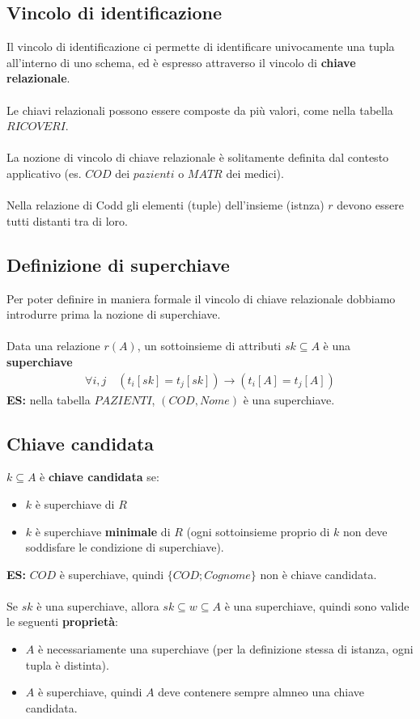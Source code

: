 \subsection{Vincolo di identificazione}
Il vincolo di identificazione ci permette di identificare univocamente una tupla all'interno di uno schema, ed è espresso attraverso il vincolo di \textbf{chiave relazionale}.\\\\
Le chiavi relazionali possono essere composte da più valori, come nella tabella $RICOVERI$.\\\\
La nozione di vincolo di chiave relazionale è solitamente definita dal contesto applicativo (es. $COD$ dei $pazienti$ o $MATR$ dei medici).\\\\
Nella relazione di Codd gli elementi (tuple) dell'insieme (istnza) $r$ devono essere tutti distanti tra di loro.

\subsection{Definizione di superchiave}
Per poter definire in maniera formale il vincolo di chiave relazionale dobbiamo introdurre prima la nozione di superchiave.\\\\
Data una relazione $r(A)$, un sottoinsieme di attributi $sk \subseteq A$ è una \textbf{superchiave} 
    \begin{equation}\begin{aligned}
        \forall i,j \quad 
        (t_i[sk] = t_j[sk]) \rightarrow (t_i[A] = t_j[A])
    \end{aligned}\end{equation}
\textbf{ES:} nella tabella $PAZIENTI$, $(COD, Nome)$ è una superchiave.

\subsection{Chiave candidata}
$k \subseteq A$ è \textbf{chiave candidata} se:
    \begin{itemize}
        \item{$k$ è superchiave di $R$}
        \item{$k$ è superchiave \textbf{minimale} di $R$ (ogni sottoinsieme proprio di $k$ non deve soddisfare le condizione di superchiave).}
    \end{itemize}    
\textbf{ES:} $COD$ è superchiave, quindi $\{COD; Cognome\}$ non è chiave candidata.\\\\
Se $sk$ è una superchiave, allora $sk \subseteq w \subseteq A$ è una superchiave, quindi sono valide le seguenti \textbf{proprietà}:
    \begin{itemize}
        \item{$A$ è necessariamente una superchiave (per la definizione stessa di istanza, ogni tupla è distinta).}
        \item{$A$ è superchiave, quindi $A$ deve contenere sempre almneo una chiave candidata.}
    \end{itemize}

